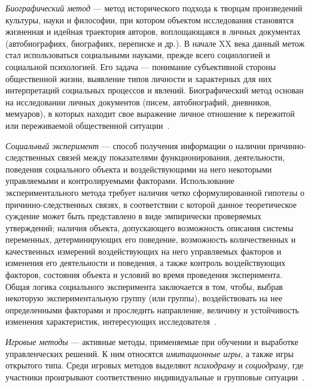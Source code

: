 \emph{Биографический метод} --- метод исторического подхода к творцам произведений культуры,
науки и философии, при котором объектом исследования становятся жизненная и идейная траектория
авторов, воплощающаяся в личных документах (автобиографиях, биографиях, переписке и др.).
В начале XX века данный метож стал использоваться социальными науками,
прежде всего социологией и социальной психологией.
Его задача --- понимание субъективной стороны общественной жизни,
выявление типов личности и характерных для них интерпретаций социальных процессов и явлений.
Биографический метод основан на исследовании личных документов
(писем, автобиографий, дневников, мемуаров),
в которых находит свое выражение личное отношение к пережитой или
переживаемой общественной ситуации~\cite{kasavin2009}.

\emph{Социальный эксперимент} --- способ получения информации о наличии причинно-следственных
связей между показателями функционирования, деятельности, поведения социального объекта и
воздействующими на него некоторыми управляемыми и контролируемыми факторами.
Использование экспериментального метода требует наличия четко сформулированной гипотезы
о причинно-следственных связях, в соответствии с которой данное теоретическое суждение
может быть представлено в виде эмпирически проверяемых утверждений;
наличия объекта, допускающего
возможность описания системы переменных, детерминирующих его поведение,
возможность количественных и качественных измерений воздействующих на него
управляемых факторов и изменения его деятельности и поведения,
а также контроль воздействующих факторов, состояния объекта и условий во время проведения эксперимента.
Общая логика социального эксперимента заключается в том, чтобы, выбрав некоторую
экспериментальную группу (или группы), воздействовать на нее определенными факторами
и проследить направление, величину и устойчивость изменения характеристик,
интересующих исследователя~\cite{volovich1990}.

\emph{Игровые методы} --- активные методы, применяемые при обучении и выработке
управленческих решений. К ним относятся \emph{имитационные игры}, а также игры открытого типа.
Среди игровых методов выделяют \emph{психодраму} и \emph{социодраму}, где участники проигрывают
соответственно индивидуальные и групповые ситуации~\cite{komarova2014}.